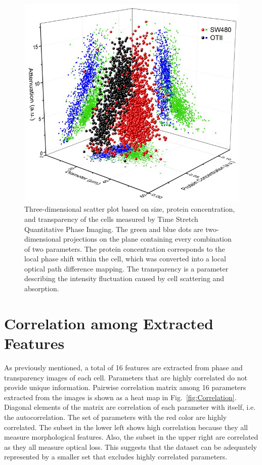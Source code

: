 \documentclass[aps,pra,reprint,superscriptaddress]{revtex4-1}
\begin{document}
\begin{figure}
\includegraphics[scale=0.6]{FigureOTSWScatter.jpg}
\caption{\label{fig:OTSWScatter} Three-dimensional scatter plot based on size, protein concentration, and transparency of the cells measured by Time Stretch Quantitative Phase Imaging. The green and blue dots are two-dimensional projections on the plane containing every combination of two parameters. The protein concentration corresponds to the local phase shift within the cell, which was converted into a local optical path difference mapping. The transparency is a parameter describing the intensity fluctuation caused by cell scattering and absorption.}
\end{figure}

\section{Correlation among Extracted Features}

As previously mentioned, a total of 16 features are extracted from phase and transparency images of each cell. Parameters that are highly correlated do not provide unique information. Pairwise correlation matrix among 16 parameters extracted from the images is shown as a heat map in Fig.~\ref{fig:Correlation}. Diagonal elements of the matrix are correlation of each parameter with itself, i.e. the autocorrelation. The set of parameters with the red color are highly correlated. The subset in the lower left shows high correlation because they all measure morphological features. Also, the subset in the upper right are correlated as they all measure optical loss. This suggests that the dataset can be adequately represented by a smaller set that excludes highly correlated parameters.
\end{document}
